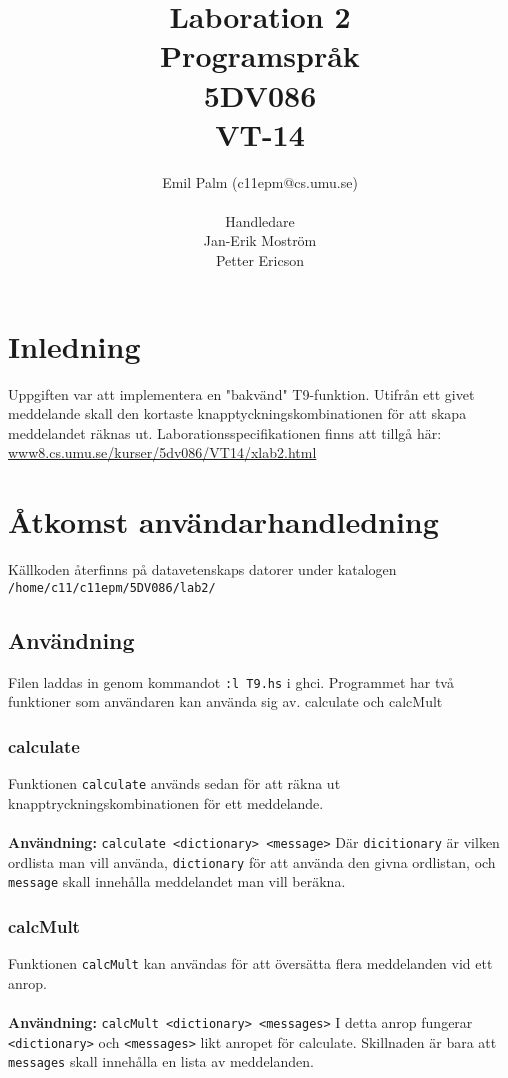 \documentclass[a4paper]{article}
\title{Laboration 2 \\ 
Programspråk \\5DV086\\
VT-14
}
\author{Emil Palm (c11epm@cs.umu.se) \\  \\ Handledare \\Jan-Erik Moström \\ Petter Ericson}
\def\code#1{\texttt{#1}}
\begin{document}
\maketitle
\newpage


\tableofcontents

\newpage



\section{Inledning}
Uppgiften var att implementera en "bakvänd" T9-funktion. Utifrån ett givet meddelande skall den kortaste knapptyckningskombinationen för att skapa meddelandet räknas ut.
Laborationsspecifikationen finns att tillgå här: \url{www8.cs.umu.se/kurser/5dv086/VT14/xlab2.html}
\section{Åtkomst användarhandledning}\label{ref}
Källkoden återfinns på datavetenskaps datorer under katalogen \\
\code{/home/c11/c11epm/5DV086/lab2/}

\subsection{Användning}
Filen laddas in genom kommandot \code{:l T9.hs} i ghci.
Programmet har två funktioner som användaren kan använda sig av. calculate och calcMult
\subsubsection{calculate}
Funktionen \code{calculate} används sedan för att räkna ut knapptryckningskombinationen för ett meddelande.\\ \\
\textbf{Användning:} \code{calculate <dictionary> <message>}
Där \code{dicitionary} är vilken ordlista man vill använda, \code{dictionary} för att använda den givna ordlistan, och \code{message} skall innehålla meddelandet man vill beräkna.
\subsubsection{calcMult}
Funktionen \code{calcMult} kan användas för att översätta flera meddelanden vid ett anrop. \\ \\
\textbf{Användning:} \code{calcMult <dictionary> <messages>}
I detta anrop fungerar \code{<dictionary>} och \code{<messages>} likt anropet för calculate. Skillnaden är bara att \code{messages} skall innehålla en lista av meddelanden.
\end{document}
